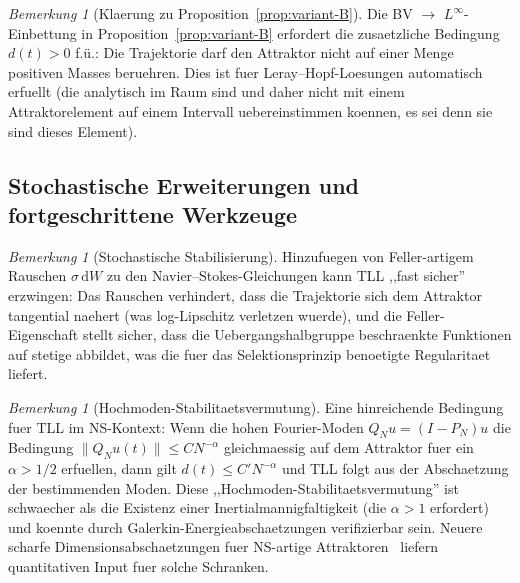 \documentclass[12pt,a4paper]{article}
\theoremstyle{definition}
\theoremstyle{plain}
\theoremstyle{remark}
\newtheorem{remark}[definition]{Bemerkung}
\begin{document}
\begin{remark}[Klaerung zu Proposition~\ref{prop:variant-B}]
\label{rem:prop-variant-B-clarification}
Die BV $\to$ $L^\infty$-Einbettung in Proposition~\ref{prop:variant-B} erfordert die zusaetzliche Bedingung $d(t) > 0$ f.\"u.: Die Trajektorie darf den Attraktor nicht auf einer Menge positiven Masses beruehren. Dies ist fuer Leray--Hopf-Loesungen automatisch erfuellt (die analytisch im Raum sind und daher nicht mit einem Attraktorelement auf einem Intervall uebereinstimmen koennen, es sei denn sie sind dieses Element).
\end{remark}

\subsection{Stochastische Erweiterungen und fortgeschrittene Werkzeuge}

\begin{remark}[Stochastische Stabilisierung]
\label{rem:stochastic-stabilisation}
Hinzufuegen von Feller-artigem Rauschen $\sigma\,\mathrm{d}W$ zu den Navier--Stokes-Gleichungen kann TLL ,,fast sicher'' erzwingen: Das Rauschen verhindert, dass die Trajektorie sich dem Attraktor tangential naehert (was log-Lipschitz verletzen wuerde), und die Feller-Eigenschaft stellt sicher, dass die Uebergangshalbgruppe beschraenkte Funktionen auf stetige abbildet, was die fuer das Selektionsprinzip benoetigte Regularitaet liefert.
\end{remark}

\begin{remark}[Hochmoden-Stabilitaetsvermutung]
\label{rem:high-mode-stability}
Eine hinreichende Bedingung fuer TLL im NS-Kontext: Wenn die hohen Fourier-Moden $Q_N u = (I - P_N) u$ die Bedingung $\|Q_N u(t)\| \leq C N^{-\alpha}$ gleichmaessig auf dem Attraktor fuer ein $\alpha > 1/2$ erfuellen, dann gilt $d(t) \leq C' N^{-\alpha}$ und TLL folgt aus der Abschaetzung der bestimmenden Moden. Diese ,,Hochmoden-Stabilitaetsvermutung'' ist schwaecher als die Existenz einer Inertialmannigfaltigkeit (die $\alpha > 1$ erfordert) und koennte durch Galerkin-Energieabschaetzungen verifizierbar sein. Neuere scharfe Dimensionsabschaetzungen fuer NS-artige Attraktoren~\cite{IlyinKalantarovZelik2025} liefern quantitativen Input fuer solche Schranken.
\end{remark}
\end{document}
